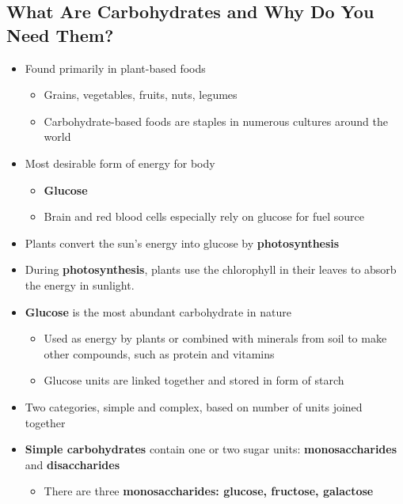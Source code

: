 \documentclass[12pt]{article}
\begin{document}
        \subsection{What Are Carbohydrates and Why Do You Need Them?}
            \begin{itemize}
                \item Found primarily in plant-based foods
                    \begin{itemize}
                        \item Grains, vegetables, fruits, nuts, legumes
                        \item Carbohydrate-based foods are staples in numerous cultures around the world
                    \end{itemize}
                \item Most desirable form of energy for body
                    \begin{itemize}
                        \item \textbf{Glucose}
                        \item Brain and red blood cells especially rely on glucose for fuel source
                    \end{itemize}
                \item Plants convert the sun's energy into glucose by \textbf{photosynthesis}
                \item During \textbf{photosynthesis}, plants use the chlorophyll in their leaves to absorb the energy in sunlight.
                \item \textbf{Glucose} is the most abundant carbohydrate in nature
                    \begin{itemize}
                        \item Used as energy by plants or combined with minerals from soil to make other compounds, such as protein and vitamins
                        \item Glucose units are linked together and stored in form of starch
                    \end{itemize}
                \item Two categories, simple and complex, based on number of units joined together
                \item \textbf{Simple carbohydrates} contain one or two sugar units: \textbf{monosaccharides} and \textbf{disaccharides}
                    \begin{itemize}
                        \item There are three \textbf{monosaccharides: glucose, fructose, galactose}

\end{itemize}
\end{itemize}
\end{document}
